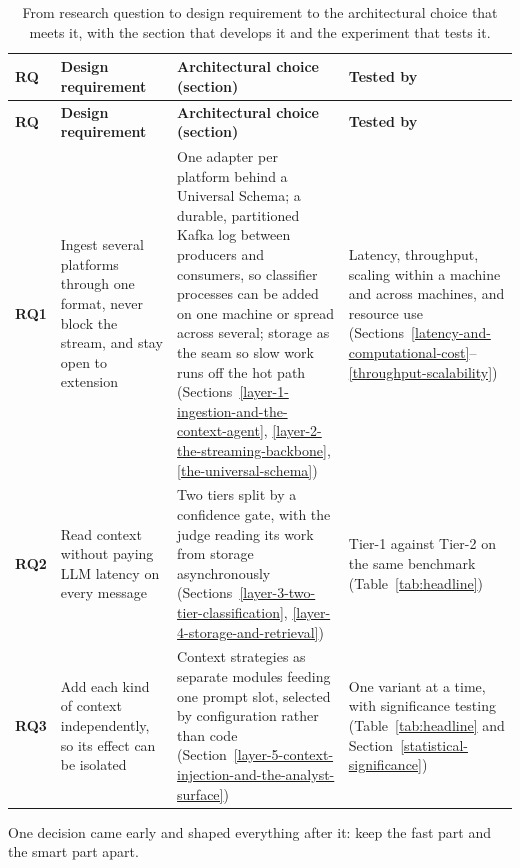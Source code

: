 \begin{longtable}{@{}
  >{\raggedright\arraybackslash}p{}
  >{\raggedright\arraybackslash}p{}
  >{\raggedright\arraybackslash}p{}
  >{\raggedright\arraybackslash}p{}@{}}
\caption{From research question to design requirement to the architectural choice that meets it, with the section that develops it and the experiment that tests it.}\label{tab:rq-design}\tabularnewline
\toprule
\textbf{RQ} & \textbf{Design requirement} & \textbf{Architectural choice (section)} & \textbf{Tested by} \\
\midrule
\endfirsthead
\toprule
\textbf{RQ} & \textbf{Design requirement} & \textbf{Architectural choice (section)} & \textbf{Tested by} \\
\midrule
\endhead
\bottomrule
\endlastfoot

\textbf{RQ1} & Ingest several platforms through one format, never block the stream, and stay open to extension & One adapter per platform behind a Universal Schema; a durable, partitioned Kafka log between producers and consumers, so classifier processes can be added on one machine or spread across several; storage as the seam so slow work runs off the hot path (Sections~\ref{layer-1-ingestion-and-the-context-agent}, \ref{layer-2-the-streaming-backbone}, \ref{the-universal-schema}) & Latency, throughput, scaling within a machine and across machines, and resource use (Sections~\ref{latency-and-computational-cost}--\ref{throughput-scalability}) \\
\addlinespace[1em]

\textbf{RQ2} & Read context without paying LLM latency on every message & Two tiers split by a confidence gate, with the judge reading its work from storage asynchronously (Sections~\ref{layer-3-two-tier-classification}, \ref{layer-4-storage-and-retrieval}) & Tier-1 against Tier-2 on the same benchmark (Table~\ref{tab:headline}) \\
\addlinespace[1em]

\textbf{RQ3} & Add each kind of context independently, so its effect can be isolated & Context strategies as separate modules feeding one prompt slot, selected by configuration rather than code (Section~\ref{layer-5-context-injection-and-the-analyst-surface}) & One variant at a time, with significance testing (Table~\ref{tab:headline} and Section~\ref{statistical-significance}) \\

\end{longtable}
\renewcommand{\arraystretch}{1.0}
One decision came early and shaped everything after it: keep the fast part and the smart part apart.

